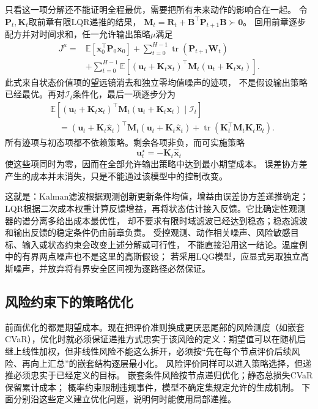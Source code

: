 只看这一项分解还不能证明全程最优，需要把所有未来动作的影响合在一起。
令$\bm P_t,\bm K_t$取前章有限LQR递推的结果，
$\bm M_t=\bm R_t+\bm B^\top\bm P_{t+1}\bm B\succ\bm0$。
回用前章逐步配方并对时间求和，任一允许输出策略$\mu$满足
\begin{align*}
  J^\mu={}&
    \mathbb E[\bm x_0^\top\bm P_0\bm x_0]
    +\sum_{t=0}^{H-1}\operatorname{tr}(\bm P_{t+1}\bm W_t)\\
    &+\sum_{t=0}^{H-1}\mathbb E[
      (\bm u_t+\bm K_t\bm x_t)^\top
      \bm M_t(\bm u_t+\bm K_t\bm x_t)].
\end{align*}
此式来自状态价值项的望远镜消去和独立零均值噪声的迹项，
不是假设输出策略已经最优。再对$\mathcal I_t$条件化，最后一项逐步分为
\begin{align*}
  &\mathbb E[
    (\bm u_t+\bm K_t\bm x_t)^\top\bm M_t
    (\bm u_t+\bm K_t\bm x_t)\mid\mathcal I_t]\\
  &\quad=
    (\bm u_t+\bm K_t\widehat{\bm x}_t)^\top\bm M_t
    (\bm u_t+\bm K_t\widehat{\bm x}_t)
    +\operatorname{tr}(\bm K_t^\top\bm M_t\bm K_t\bm E_t).
\end{align*}
所有迹项与初态项都不依赖策略。剩余各项非负，而可实施策略
\begin{equation}
  \bm u_t^\star=-\bm K_t\widehat{\bm x}_t
  \label{eq:policy-finite-lqg-feedback}
\end{equation}
使这些项同时为零，因而在全部允许输出策略中达到最小期望成本。
误差协方差产生的成本并未消失，只是不能通过该模型中的控制改变。

这就是：Kalman滤波根据观测创新更新条件均值，增益由误差协方差递推确定；
LQR根据二次成本权重计算反馈增益，再将状态估计接入反馈。它比确定性观测器的谱分离多给出成本最优性，
却不要求有限时域滤波已经达到稳态；稳态滤波和输出反馈的稳定条件仍由前章负责。
受控观测、动作相关噪声、风险敏感目标、输入或状态约束会改变上述分解或可行性，
不能直接沿用这一结论。温度例中的有界两点噪声也不是这里的高斯假设；
若采用LQG模型，应显式另取独立高斯噪声，并放弃将有界安全区间视为逐路径必然保证。

\subsection{风险约束下的策略优化}
\label{sec:policy-risk-optimization}

前面优化的都是期望成本。现在把评价准则换成更厌恶尾部的风险测度（如嵌套 CVaR），优化时就必须保证递推方式忠实于该风险的定义：期望值可以在随机后继上线性加权，但非线性风险不能这么拆开，必须按“先在每个节点评价后续风险、再向上汇总”的嵌套结构逐层最小化。
风险评价同样可以进入策略选择，但递推必须忠实于已经定义的目标。
嵌套条件风险按节点递归优化；静态总损失CVaR保留累计成本；
概率约束限制违规事件，模型不确定集规定允许的生成机制。
下面分别沿这些定义建立优化问题，说明何时能使用局部递推。

